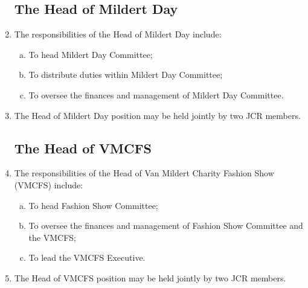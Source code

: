 \documentclass[12pt]{article}  %
\begin{document}
\begin{enumerate}
    \subsection{The Head of Mildert Day}
    \item The responsibilities of the Head of Mildert Day include:
    \begin{enumerate}[(a)]
        \item To head Mildert Day Committee;
        \item To distribute duties within Mildert Day Committee;
        \item To oversee the finances and management of Mildert Day Committee.
    \end{enumerate}
    \item The Head of Mildert Day position may be held jointly by two JCR members.
    \subsection{The Head of VMCFS}
    \item The responsibilities of the Head of Van Mildert Charity Fashion Show (VMCFS) include:
    \begin{enumerate}[(a)]
        \item To head Fashion Show Committee;
        \item To oversee the finances and management of Fashion Show Committee and the VMCFS;
        \item To lead the VMCFS Executive.
    \end{enumerate}
    \item The Head of VMCFS position may be held jointly by two JCR members.
\end{enumerate}
\newpage
\end{document}
